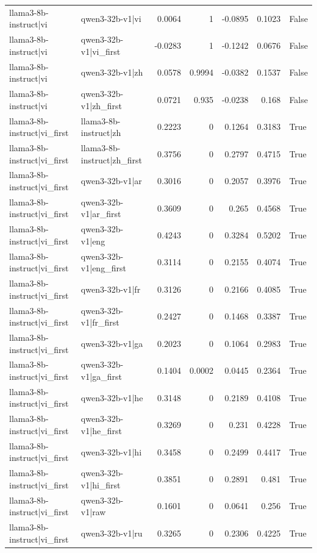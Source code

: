 \begin{table}
\begin{tabular}{l l r r r r l}
llama3-8b-instruct|vi & qwen3-32b-v1|vi & 0.0064 & 1 & -0.0895 & 0.1023 & False \\
llama3-8b-instruct|vi & qwen3-32b-v1|vi_first & -0.0283 & 1 & -0.1242 & 0.0676 & False \\
llama3-8b-instruct|vi & qwen3-32b-v1|zh & 0.0578 & 0.9994 & -0.0382 & 0.1537 & False \\
llama3-8b-instruct|vi & qwen3-32b-v1|zh_first & 0.0721 & 0.935 & -0.0238 & 0.168 & False \\
llama3-8b-instruct|vi_first & llama3-8b-instruct|zh & 0.2223 & 0 & 0.1264 & 0.3183 & True \\
llama3-8b-instruct|vi_first & llama3-8b-instruct|zh_first & 0.3756 & 0 & 0.2797 & 0.4715 & True \\
llama3-8b-instruct|vi_first & qwen3-32b-v1|ar & 0.3016 & 0 & 0.2057 & 0.3976 & True \\
llama3-8b-instruct|vi_first & qwen3-32b-v1|ar_first & 0.3609 & 0 & 0.265 & 0.4568 & True \\
llama3-8b-instruct|vi_first & qwen3-32b-v1|eng & 0.4243 & 0 & 0.3284 & 0.5202 & True \\
llama3-8b-instruct|vi_first & qwen3-32b-v1|eng_first & 0.3114 & 0 & 0.2155 & 0.4074 & True \\
llama3-8b-instruct|vi_first & qwen3-32b-v1|fr & 0.3126 & 0 & 0.2166 & 0.4085 & True \\
llama3-8b-instruct|vi_first & qwen3-32b-v1|fr_first & 0.2427 & 0 & 0.1468 & 0.3387 & True \\
llama3-8b-instruct|vi_first & qwen3-32b-v1|ga & 0.2023 & 0 & 0.1064 & 0.2983 & True \\
llama3-8b-instruct|vi_first & qwen3-32b-v1|ga_first & 0.1404 & 0.0002 & 0.0445 & 0.2364 & True \\
llama3-8b-instruct|vi_first & qwen3-32b-v1|he & 0.3148 & 0 & 0.2189 & 0.4108 & True \\
llama3-8b-instruct|vi_first & qwen3-32b-v1|he_first & 0.3269 & 0 & 0.231 & 0.4228 & True \\
llama3-8b-instruct|vi_first & qwen3-32b-v1|hi & 0.3458 & 0 & 0.2499 & 0.4417 & True \\
llama3-8b-instruct|vi_first & qwen3-32b-v1|hi_first & 0.3851 & 0 & 0.2891 & 0.481 & True \\
llama3-8b-instruct|vi_first & qwen3-32b-v1|raw & 0.1601 & 0 & 0.0641 & 0.256 & True \\
llama3-8b-instruct|vi_first & qwen3-32b-v1|ru & 0.3265 & 0 & 0.2306 & 0.4225 & True \\

\end{tabular}
\end{table}
